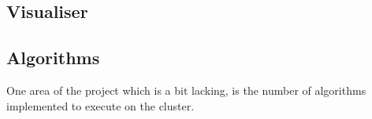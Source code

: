\subsection{Visualiser}

\subsection{Algorithms}
One area of the project which is a bit lacking, is the number of algorithms implemented to execute on the cluster. 

